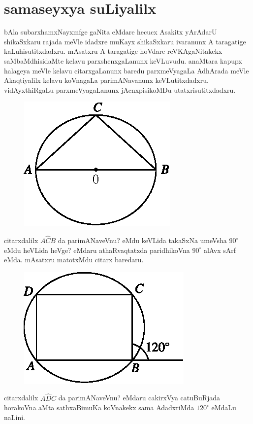 \chapter{samaseyxya suLiyalilx}

bAla subarxhamxNayxmfge gaNita eMdare hecucx Asakitx yArAdarU shikaSxkaru rajada meVle idadxre muKayx shikaSxkaru ivaranunx A taragatige kaLuhisutitxdadxru. mAsatxru A taragatige hoVdare reVKAgaNitakekx saMbaMdhisidaMte kelavu parxshenxgaLanunx keVLuvudu. anaMtara kapupx halageya meVle kelavu citarxgaLanunx baredu parxmeVyagaLa AdhArada meVle Akaqtiyalilx kelavu koVnagaLa parimANavanunx keVLutitxdadxru. vidAyxthiRgaLu parxmeVyagaLanunx jAcnxpisikoMDu utatxrisutitxdadxru.
\begin{figure}[H]
\centering
\includegraphics[scale=0.7]{src/figures/m_179a.eps} 
\end{figure}
citarxdalilx $A\hat{C}B$ da parimANaveVnu? eMdu keVLida takaSxNa umeVsha $90^\circ$ eMdu heVLida heVge? eMdaru athaRvaqtatxda paridhikoVna $90^\circ$ alAvx sArf eMda. mAsatxru matotxMdu citarx baredaru.
\begin{figure}[H]
\centering
\includegraphics[scale=0.7]{src/figures/m_179b.eps}
\end{figure}
citarxdalilx $A\hat{D}C$ da parimANaveVnu? eMdaru cakirxVya catuBuRjada horakoVna aMta sathxaBimuKa koVnakekx sama AdadxriMda $120^\circ$ eMdaLu naLini.
